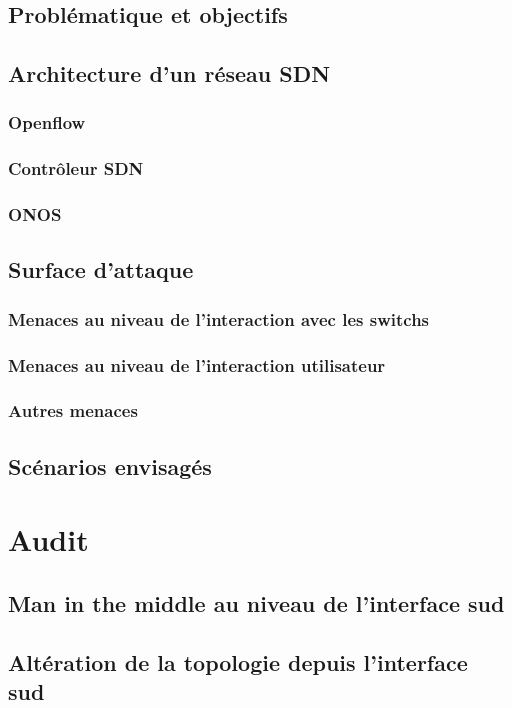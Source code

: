 \documentclass[a4paper]{article}
\begin{document}
	\subsection{Problématique et objectifs}
	\subsection{Architecture d'un réseau SDN}
		\subsubsection{Openflow}
		\subsubsection{Contrôleur SDN}
		\subsubsection{ONOS}
	\subsection{Surface d'attaque}
		\subsubsection{Menaces au niveau de l'interaction avec les switchs}
		\subsubsection{Menaces au niveau de l'interaction utilisateur}
		\subsubsection{Autres menaces}
	\subsection{Scénarios envisagés}
\section{Audit}
	\subsection{Man in the middle au niveau de l'interface sud}
	\subsection{Altération de la topologie depuis l'interface sud}
\end{document}
